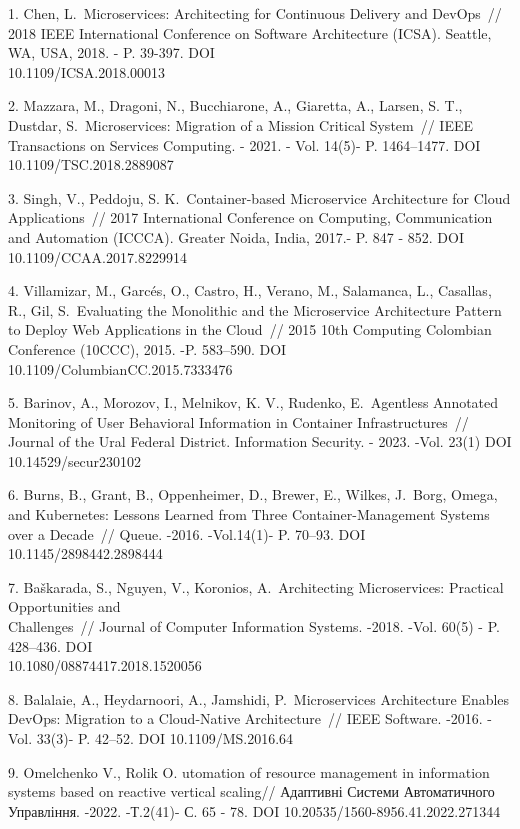 \begin{references}
1. Chen, L.~Microservices: Architecting for Continuous Delivery and
DevOps~// 2018 IEEE International Conference on Software Architecture
(ICSA). Seattle, WA, USA, 2018. - P. 39-397. DOI\\
10.1109/ICSA.2018.00013

2. Mazzara, M., Dragoni, N., Bucchiarone, A., Giaretta, A., Larsen, S.
T., Dustdar, S.~Microservices: Migration of a Mission Critical
System~// IEEE Transactions on Services Computing. - 2021. - Vol.
14(5)- P. 1464--1477. DOI 10.1109/TSC.2018.2889087

3. Singh, V., Peddoju, S. K.~Container-based Microservice Architecture
for Cloud Applications~// 2017 International Conference on Computing,
Communication and Automation (ICCCA). Greater Noida, India, 2017.- P.
847 - 852. DOI 10.1109/CCAA.2017.8229914

4. Villamizar, M., Garcés, O., Castro, H., Verano, M., Salamanca, L.,
Casallas, R., Gil, S.~Evaluating the Monolithic and the Microservice
Architecture Pattern to Deploy Web Applications in the Cloud~// 2015
10th Computing Colombian Conference (10CCC), 2015. -P. 583--590. DOI\\
10.1109/ColumbianCC.2015.7333476

5. Barinov, A., Morozov, I., Melnikov, K. V., Rudenko, E.~Agentless
Annotated Monitoring of User Behavioral Information in Container
Infrastructures~// Journal of the Ural Federal District. Information
Security. - 2023. -Vol. 23(1) DOI 10.14529/secur230102

6. Burns, B., Grant, B., Oppenheimer, D., Brewer, E., Wilkes, J.~Borg,
Omega, and Kubernetes: Lessons Learned from Three Container-Management
Systems over a Decade~// Queue. -2016. -Vol.14(1)- P. 70--93. DOI
10.1145/2898442.2898444

7. Baškarada, S., Nguyen, V., Koronios, A.~Architecting Microservices:
Practical Opportunities and\\ Challenges~// Journal of Computer
Information Systems. -2018. -Vol. 60(5) - P. 428--436. DOI\\
10.1080/08874417.2018.1520056

8. Balalaie, A., Heydarnoori, A., Jamshidi, P.~Microservices Architecture
Enables DevOps: Migration to a Cloud-Native Architecture~// IEEE
Software. -2016. -Vol. 33(3)- P. 42--52. DOI 10.1109/MS.2016.64

9. Omelchenko V., Rolik O. utomation of resource management in
information systems based on reactive vertical scaling// Адаптивні
Системи Автоматичного Управління. -2022. -Т.2(41)- С. 65 - 78. DOI
10.20535/1560-8956.41.2022.271344


\end{references}
